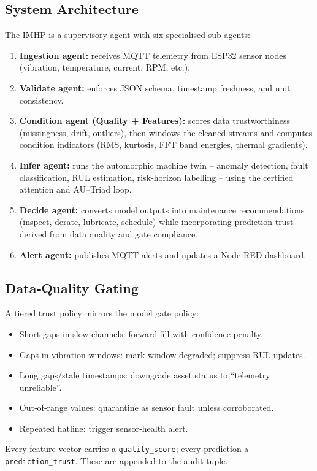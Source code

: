 \documentclass[12pt]{article}
\theoremstyle{plain}
\theoremstyle{definition}
\theoremstyle{remark}
\begin{document}
\subsection{System Architecture}
The IMHP is a supervisory agent with six specialised sub‑agents:
\begin{enumerate}[nosep]
    \item \textbf{Ingestion agent:} receives MQTT telemetry from ESP32 sensor nodes (vibration, temperature, current, RPM, etc.).
    \item \textbf{Validate agent:} enforces JSON schema, timestamp freshness, and unit consistency.
    \item \textbf{Condition agent (Quality + Features):} scores data trustworthiness (missingness, drift, outliers), then windows the cleaned streams and computes condition indicators (RMS, kurtosis, FFT band energies, thermal gradients).
    \item \textbf{Infer agent:} runs the automorphic machine twin -- anomaly detection, fault classification, RUL estimation, risk‑horizon labelling -- using the certified attention and AU–Triad loop.
    \item \textbf{Decide agent:} converts model outputs into maintenance recommendations (inspect, derate, lubricate, schedule) while incorporating prediction‑trust derived from data quality and gate compliance.
    \item \textbf{Alert agent:} publishes MQTT alerts and updates a Node‑RED dashboard.
\end{enumerate}

\subsection{Data‑Quality Gating}
A tiered trust policy mirrors the model gate policy:
\begin{itemize}[nosep]
    \item Short gaps in slow channels: forward fill with confidence penalty.
    \item Gaps in vibration windows: mark window degraded; suppress RUL updates.
    \item Long gaps/stale timestamps: downgrade asset status to ``telemetry unreliable''.
    \item Out‑of‑range values: quarantine as sensor fault unless corroborated.
    \item Repeated flatline: trigger sensor‑health alert.
\end{itemize}
Every feature vector carries a \texttt{quality\_score}; every prediction a \texttt{prediction\_trust}. These are appended to the audit tuple.
\end{document}
